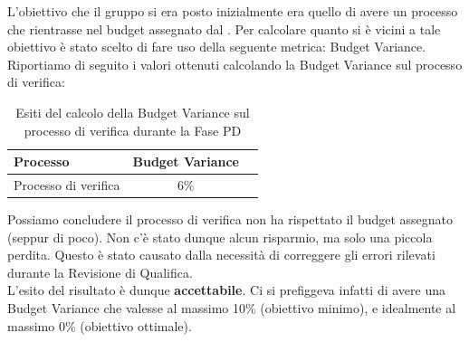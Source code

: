 				L'obiettivo che il gruppo si era posto inizialmente era quello di avere un processo che rientrasse nel budget assegnato dal . Per calcolare quanto si è vicini a tale obiettivo è stato scelto di fare uso della seguente metrica: Budget Variance.\\
				Riportiamo di seguito i valori ottenuti calcolando la Budget Variance sul processo di verifica:
				\begin{table}[H]
					\centering
					\begin{tabu}{| l | c | c |}
						\hline
						Processo 			   & Budget Variance     \\ \hline \hline
						Processo di verifica   & 6\%                 \\ \hline
					\end{tabu}
					\caption{Esiti del calcolo della Budget Variance sul processo di verifica durante la Fase PD}
				\end{table}
				Possiamo concludere il processo di verifica non ha rispettato il budget assegnato (seppur di poco). Non c'è stato dunque alcun risparmio, ma solo una piccola perdita. Questo è stato causato dalla necessità di correggere gli errori rilevati durante la Revisione di Qualifica.\\
				L'esito del risultato è dunque \textbf{accettabile}. Ci si prefiggeva infatti di avere una Budget Variance che valesse al massimo 10\% (obiettivo minimo), e idealmente al massimo 0\% (obiettivo ottimale).

